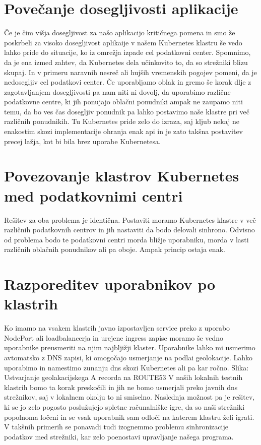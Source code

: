 \documentclass[a4paper, 12pt]{book}
\begin{document}
\section{Povečanje dosegljivosti aplikacije}
Če je čim višja dosegljivost za našo aplikacijo kritičnega pomena in smo že poskrbeli za visoko dosegljivost aplikaije v našem Kubernetes klastru še vedo lahko pride do situacije, ko iz omrežja izpade cel podatkovni center.
Spomnimo, da je ena izmed zahtev, da Kubernetes dela učinkovito to, da so strežniki blizu skupaj.
In v primeru naravnih nesreč ali hujših vremenskih pogojev pomeni, da je nedosegljiv cel podatkovi center.
Če uporabljamo oblak in gremo še korak dlje z zagotavljanjem dosegljivosti pa nam niti ni dovolj, da uporabimo različne podatkovne centre, ki jih ponujajo oblačni ponudniki ampak ne zaupamo niti temu, da bo ves čas dosegljiv ponudnik pa lahko postavimo naše klastre pri več različnih ponudnikih.
Tu Kubernetes pride zelo do izraza, saj kljub nekaj ne enakostim skozi implementacije ohranja enak api in je zato takšna postavitev precej lažja, kot bi bila brez uporabe Kubernetesa.
\section{Povezovanje klastrov Kubernetes med podatkovnimi centri}
Rešitev za oba problema je identična.
Postaviti moramo Kubernetes klastre v več različnih podatkovnih centrov in jih nastaviti da bodo delovali sinhrono. Odvisno od problema bodo te podatkovni centri morda bližje uporabniku, morda v lasti različnih oblačnih ponudnikov ali pa oboje. Ampak princip ostaja enak.
\section{Razporeditev uporabnikov po klastrih}
Ko imamo na vsakem klastrih javno izpostavljen service preko z uporabo NodePort ali loadbalancerja in urejene ingress zapise moramo še vedno uporabnike preusmeriti na njim najbljižji klaster.
Uporabnike lahko mi usmerimo avtomatsko z DNS zapisi, ki omogočajo usmerjanje na podlai geolokacije.
Lahko uporabimo in namestimo zunanju dns skozi Kubernetes ali pa kar ročno.
Slika: Ustvarjanje geolakacijskega A recorda na ROUTE53
V naših lokalnih testnih klastrih bomo ta korak preskočili in jih ne bomo usmerjali preko javnih dns strežnikov, saj v lokalnem okolju to ni smiselno.
Naslednja možnost pa je rešitev, ki se jo zelo pogosto poslužujejo spletne računalniške igre, da so naši strežniki popolnoma ločeni in se vsak uporabnik sam odloči na katerem klastru želi igrati.
V takšnih primerih se ponavadi tudi izognemmo problemu sinhronizacije podatkov med strežniki, kar zelo poenostavi upravljanje našega programa.
\end{document}
